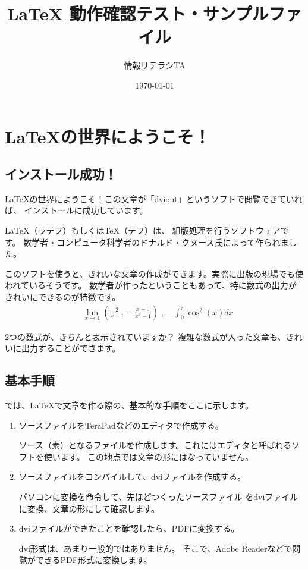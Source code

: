 \documentclass[a4j,12pt]{jreport}
\title{ {\LaTeX} 動作確認テスト・サンプルファイル}
\author{情報リテラシTA}
\date{\today}
\begin{document}
\nocite{*}
\maketitle

\chapter{\LaTeX の世界にようこそ！}

\section{インストール成功！}
\LaTeX の世界にようこそ！この文章が「dviout」というソフトで閲覧できていれば、
インストールに成功しています。

\LaTeX（ラテフ）もしくは\TeX（テフ）は、
組版処理を行うソフトウェアです。
数学者・コンピュータ科学者のドナルド・クヌース氏によって作られました。

このソフトを使うと、きれいな文章の作成ができます。実際に出版の現場でも使われているそうです。
数学者が作ったということもあって、特に数式の出力がきれいにできるのが特徴です。
\begin{eqnarray}
& \displaystyle \lim _{x \rightarrow 1} \left( \frac{2}{x-1} - \frac{x+5}{x^3 -1} \right)\; ,\; 
& \displaystyle \int ^\pi _0 \cos ^2 (x)dx \nonumber
\end{eqnarray}


2つの数式が、きちんと表示されていますか？
複雑な数式が入った文章も、きれいに出力することができます。



\section{基本手順}

では、\LaTeX で文章を作る際の、基本的な手順をここに示します。


\begin{enumerate}
 \item ソースファイルをTeraPadなどのエディタで作成する。
 
 ソース（素）となるファイルを作成します。これにはエディタと呼ばれるソフトを使います。
 この地点では文章の形にはなっていません。
 
 \item ソースファイルをコンパイルして、dviファイルを作成する。
 
 パソコンに変換を命令して、先ほどつくったソースファイル
 をdviファイルに変換、文章の形にして確認します。
 
 \item dviファイルができたことを確認したら、PDFに変換する。
 
 dvi形式は、あまり一般的ではありません。
 そこで、Adobe Readerなどで閲覧ができるPDF形式に変換します。
 
 
\end{enumerate}
\end{document}
